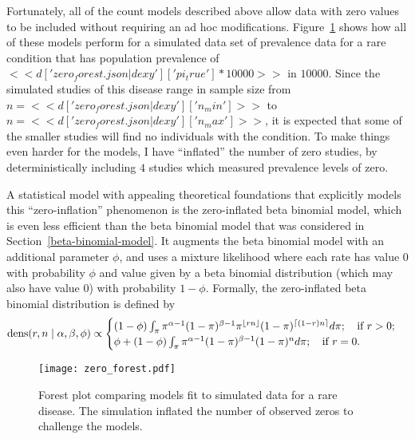 Fortunately, all of the count models described above allow data with
zero values to be included without requiring an ad hoc modifications.
Figure~\ref{zero-forest} shows how all of these models perform for a
simulated data set of prevalence data for a rare condition that has
population prevalence of
$<<d['zero_forest.json|dexy']['pi_true']*10000>>$ in $10000$.  Since
the simulated studies of this disease range in sample size from
$n=<<d['zero_forest.json|dexy']['n_min']>>$ to
$n=<<d['zero_forest.json|dexy']['n_max']>>$, it is expected that some
of the smaller studies will find no individuals with the condition.
To make things even harder for the models, I have ``inflated'' the
number of zero studies, by deterministically including $4$ studies
which measured prevalence levels of zero.

A statistical model with appealing theoretical foundations that
explicitly models this ``zero-inflation'' phenomenon is the
zero-inflated beta binomial model, which is even less efficient than
the beta binomial model that was considered in
Section~\ref{beta-binomial-model}.  It augments the beta binomial
model with an additional parameter $\phi$, and uses a mixture
likelihood where each rate has value $0$ with probability $\phi$ and
value given by a beta binomial distribution (which may also have value
$0$) with probability $1-\phi$.  Formally, the zero-inflated beta
binomial distribution is defined by
\[
\operatorname{dens}(r,n\;|\; \alpha, \beta, \phi) \propto \begin{cases}
(1-\phi)\int_{\pi}
\pi^{\alpha-1}(1-\pi)^{\beta-1} \pi^{\lfloor rn\rfloor}
(1-\pi)^{\lceil (1-r)n\rceil}
d\pi; \quad\text{if } r > 0;
\\
\phi + (1-\phi)\int_{\pi}
\pi^{\alpha-1}(1-\pi)^{\beta-1}
(1-\pi)^{n}
d\pi; \quad\text{if } r = 0.
\end{cases}
\]

\begin{figure}
\texttt{[image: zero\_forest.pdf]}
\caption{Forest plot comparing models fit to simulated data for a rare
  disease.  The simulation inflated the number of observed zeros to
  challenge the models.}
\label{zero-forest}
\end{figure}




